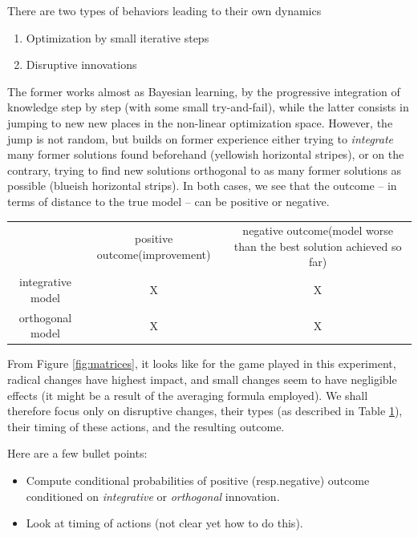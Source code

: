\documentclass{article}
\begin{document}
There are two types of behaviors leading to their own dynamics
\begin{enumerate}
\item Optimization by small iterative steps
\item Disruptive innovations
\end{enumerate}
  
The former works almost as Bayesian learning, by the progressive integration of knowledge step by step (with some small try-and-fail), while the latter consists in jumping to new new places in the non-linear optimization space. However, the jump is not random, but builds on former experience either trying to {\it integrate} many former solutions found beforehand (yellowish horizontal stripes), or on the contrary, trying to find new solutions orthogonal to as many former solutions as possible (blueish horizontal strips). In both cases, we see that the outcome -- in terms of distance to the true model -- can be positive or negative.

\begin{table} 
    \begin{tabular}{ c c c }
         & positive outcome(improvement) & negative outcome(model worse than the best solution achieved so far) \\ 
        integrative model & X  & X \\ 
        orthogonal model & X &  X \\ 
    \end{tabular}
\label{tab:table}
\end{table}

From Figure \ref{fig:matrices}, it looks like for the game played in this experiment, radical changes have highest impact, and small changes seem to have negligible effects (it might be a result of the averaging formula employed). We shall therefore focus only on disruptive changes, their types (as described in Table \ref{tab:table}), their timing of these actions, and the resulting outcome.

Here are a few bullet points:
\begin{itemize}
\item Compute conditional probabilities of positive (resp.negative) outcome conditioned on {\it integrative} or {\it orthogonal} innovation. 
\item Look at timing of actions (not clear yet how to do this).
\end{itemize}
\end{document}
